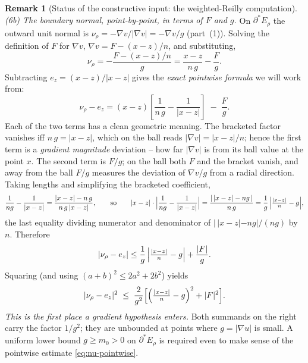 \documentclass[11pt]{amsart}
\theoremstyle{definition}
\newtheorem{remark}[theorem]{Remark}
\begin{document}
\begin{remark}[Status of the constructive input: the weighted-Reilly computation]
\emph{(6b) The boundary normal, point-by-point, in terms of \(F\) and \(g\).}
On \(\partial^*E_\rho\) the outward unit normal is
\(\nu_\rho=-\nabla v/|\nabla v|=-\nabla v/g\) (part~(1)).  Solving the
definition of \(F\) for \(\nabla v\), \(\nabla v=F-(x-z)/n\), and substituting,
\[
   \nu_\rho
   =-\frac{F-(x-z)/n}{g}
   =\frac{x-z}{n\,g}-\frac{F}{g}.
\]
Subtracting \(e_z=(x-z)/|x-z|\) gives the \emph{exact pointwise formula} we will
work from:
\begin{equation}\label{eq:nu-minus-ez}
   \nu_\rho-e_z
   =(x-z)\!\left[\frac{1}{n\,g}-\frac{1}{|x-z|}\right]\;-\;\frac{F}{g}.
\end{equation}
Each of the two terms has a clean geometric meaning.  The bracketed factor
vanishes iff \(n\,g=|x-z|\), which on the ball reads \(|\nabla v|=|x-z|/n\);
hence the first term is a \emph{gradient magnitude} deviation -- how far
\(|\nabla v|\) is from its ball value at the point \(x\).  The second term is
\(F/g\); on the ball both \(F\) and the bracket vanish, and away from the ball
\(F/g\) measures the deviation of \(\nabla v/g\) from a radial direction.
Taking lengths and simplifying the bracketed coefficient,
\[
   \frac1{ng}-\frac1{|x-z|}
   =\frac{|x-z|-n\,g}{n\,g\,|x-z|},
   \qquad\text{so}\qquad
   |x-z|\cdot\Bigl|\frac1{ng}-\frac1{|x-z|}\Bigr|
   =\frac{|\,|x-z|-ng\,|}{n\,g}
   =\frac{1}{g}\,\Bigl|\tfrac{|x-z|}{n}-g\Bigr| ,
\]
the last equality dividing numerator and denominator of \(|\,|x-z|-ng|/(ng)\) by
\(n\).  Therefore
\[
   |\nu_\rho-e_z|\le\frac1g\,\Bigl|\tfrac{|x-z|}{n}-g\Bigr|+\frac{|F|}{g}.
\]
Squaring (and using \((a+b)^2\le2a^2+2b^2\)) yields
\begin{equation}\label{eq:nu-pointwise}
   |\nu_\rho-e_z|^2\;\le\;\frac{2}{g^2}\Bigl[\Bigl(\tfrac{|x-z|}{n}-g\Bigr)^2+|F|^2\Bigr] .
\end{equation}
\emph{This is the first place a gradient hypothesis enters.}  Both summands on
the right carry the factor \(1/g^2\); they are unbounded at points where
\(g=|\nabla u|\) is small.  A uniform lower bound \(g\ge m_0>0\) on
\(\partial^*E_\rho\) is required even to make sense of the pointwise estimate
\eqref{eq:nu-pointwise}.


\end{remark}
\end{document}
